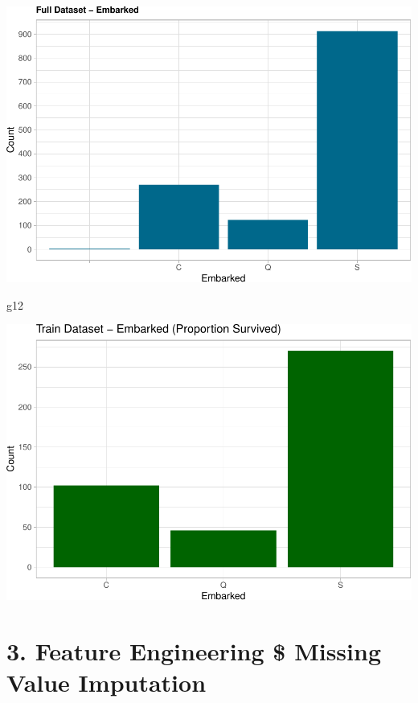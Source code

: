 \documentclass[
]{article}
\newenvironment{Shaded}{\begin{snugshade}}{\end{snugshade}}
\newcommand{\NormalTok}[1]{#1}
\begin{document}
\includegraphics{final_pdf_files/figure-latex/unnamed-chunk-23-1.pdf}

\begin{Shaded}
\begin{Highlighting}[]
\NormalTok{g12}
\end{Highlighting}
\end{Shaded}

\includegraphics{final_pdf_files/figure-latex/unnamed-chunk-23-2.pdf}

\hypertarget{feature-engineering-missing-value-imputation}{%
\section{\texorpdfstring{\textbf{3. Feature Engineering \$ Missing Value
Imputation}}{3. Feature Engineering \$ Missing Value Imputation}}\label{feature-engineering-missing-value-imputation}}
\end{document}

